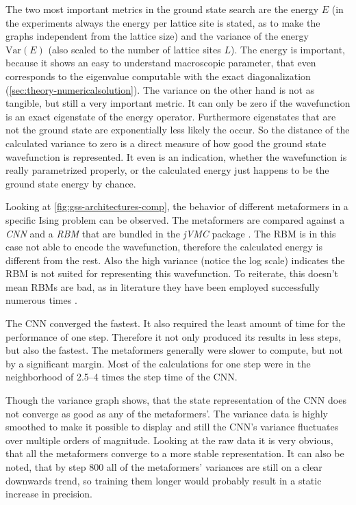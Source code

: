 The two most important metrics in the ground state search are the energy $E$ (in the experiments always the energy per lattice site is stated, as to make the graphs independent from the lattice size) and the variance of the energy $\mathrm{Var}(E)$ (also scaled to the number of lattice sites $L$). 
The energy is important, because it shows an easy to understand macroscopic parameter, that even corresponds to the eigenvalue computable with the exact diagonalization (\autoref{sec:theory-numericalsolution}).
The variance on the other hand is not as tangible, but still a very important metric.
It can only be zero if the wavefunction is an exact eigenstate of the energy operator. 
Furthermore eigenstates that are not the ground state are exponentially less likely the occur.
So the distance of the calculated variance to zero is a direct measure of how good the ground state wavefunction is represented.
It even is an indication, whether the wavefunction is really parametrized properly, or the calculated energy just happens to be the ground state energy by chance.

Looking at \autoref{fig:gss-architectures-comp}, the behavior of different metaformers in a specific Ising problem can be observed.
The metaformers are compared against a \emph{CNN} and a \emph{RBM} that are bundled in the \emph{jVMC} package \cite{jVMCgithub}.
The RBM is in this case not able to encode the wavefunction, therefore the calculated energy is different from the rest. 
Also the high variance (notice the log scale) indicates the RBM is not suited for representing this wavefunction.
To reiterate, this doesn't mean RBMs are bad, as in literature they have been employed successfully numerous times \cite{restrictedBoltzmanMachines}.

The CNN converged the fastest. It also required the least amount of time for the performance of one step.
Therefore it not only produced its results in less steps, but also the fastest.
The metaformers generally were slower to compute, but not by a significant margin. 
Most of the calculations for one step were in the neighborhood of \SIrange[]{2.5}{4}{} times the step time of the CNN.

Though the variance graph shows, that the state representation of the CNN does not converge as good as any of the metaformers'.
The variance data is highly smoothed to make it possible to display and still the CNN's variance fluctuates over multiple orders of magnitude.
Looking at the raw data it is very obvious, that all the metaformers converge to a more stable representation.
It can also be noted, that by step 800 all of the metaformers' variances are still on a clear downwards trend, so training them longer would probably result in a static increase in precision.

